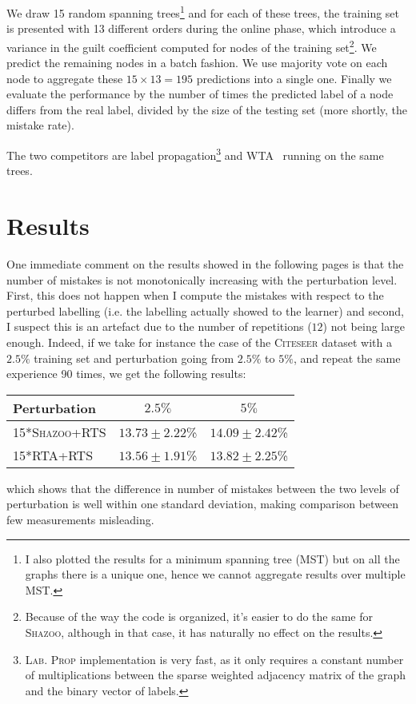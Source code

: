 \documentclass[a4paper,final,notitlepage,11pt,svgnames]{article}
\newcommand{\rta}{\textsc{RTA}}
\newcommand{\wta}{\textsc{WTA}}
\newcommand{\shazoo}{\textsc{Shazoo}}
\newcommand{\lprop}{\textsc{Lab. Prop}}
\newcommand{\citeseer}{\textsc{Citeseer}}
\begin{document}
We draw 15 random spanning trees\footnote{I also plotted the results for a
minimum spanning tree (MST) but on all the graphs there is a unique one, hence
we cannot aggregate results over multiple MST.} and for each of these trees, the training
set is presented with 13 different orders during the online phase, which
introduce a variance in the guilt coefficient computed for nodes of the training
set\footnote{Because of the way the code is organized, it's easier to do the
same for \shazoo{}, although in that case, it has naturally no effect on the
results.}. We predict the remaining nodes in a batch fashion. We use majority
vote on each node to aggregate these $15\times 13 = 195$ predictions into a
single one. Finally we evaluate the performance by the number of times the
predicted label of a node differs from the real label, divided by the size of
the testing set (more shortly, the mistake rate).

The two competitors are label propagation\footnote{\lprop{} implementation
is very fast, as it only requires a constant number of multiplications between
the sparse weighted adjacency matrix of the graph and the binary vector of
labels.} and \wta{}~\autocite{WTA13} running on the same trees.

\section*{Results}
\label{sec:Results}

One immediate comment on the results showed in the following pages is that the
number of mistakes is not monotonically increasing with the perturbation level.
First, this does not happen when I compute the mistakes with respect to the
perturbed labelling (i.e. the labelling actually showed to the learner) and
second, I suspect this is an artefact due to the number of repetitions ($12$) not
being large enough. Indeed, if we take for instance the case of the \citeseer{}
dataset with a $2.5\%$ training set and perturbation going from $2.5\%$ to $5\%$,
and repeat the same experience 90 times, we get the following results:
\begin{center}
  \begin{tabular}{lcc}
    \toprule
    Perturbation & $2.5\%$ & $5\%$ \\
    \midrule
    15*\shazoo{}+RTS & $13.73 \pm 2.22$\% & $14.09 \pm 2.42$\% \\
    15*\rta{}+RTS & $13.56 \pm 1.91$\% & $13.82 \pm 2.25$\% \\
    \bottomrule
  \end{tabular}
\end{center}
which shows that the difference in number of mistakes between the two levels of
perturbation is well within one standard deviation, making comparison between few
measurements misleading.
\medskip
\end{document}
